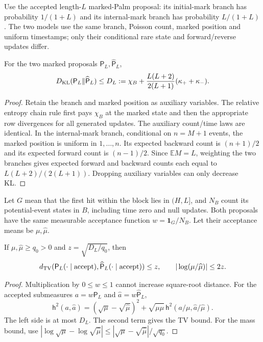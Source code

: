 Use the accepted length-$L$ marked-Palm proposal: its initial-mark branch
has probability $1/(1+L)$ and its internal-mark branch has probability
$L/(1+L)$. The two models use the same branch, Poisson count, marked
position and uniform timestamps; only their conditional rare state and
forward/reverse updates differ.

\begin{lemma}\label{lem:palmKL}
For the two marked proposals $\mathsf P_L,\widehat{\mathsf P}_L$,
\begin{equation}
D_{\rm KL}(\mathsf P_L\Vert\widehat{\mathsf P}_L)
\le D_L:=
\chi_B+\frac{L(L+2)}{2(L+1)}(\kappa_++\kappa_-).
\label{eq:DL}
\end{equation}
\end{lemma}
\begin{proof}
Retain the branch and marked position as auxiliary variables. The relative
entropy chain rule first pays $\chi_B$ at the marked state and then the
appropriate row divergences for all generated updates. The auxiliary
count/time laws are identical. In the internal-mark branch, conditional
on $n=M+1$ events, the marked position is uniform in $1,\ldots,n$.
Its expected backward count is $(n+1)/2$ and its expected forward count
is $(n-1)/2$. Since $\mathbb E M=L$, weighting the two branches gives
expected forward and backward counts each equal to
$L(L+2)/(2(L+1))$. Dropping auxiliary variables can only decrease KL.
\end{proof}

Let $G$ mean that the first hit within the block lies in $(H,L]$, and
$N_B$ count its potential-event states in $B$, including time zero and
null updates. Both proposals have the same measurable acceptance
function $w=\mathbf 1_G/N_B$. Let their acceptance means be
$\mu,\widehat\mu$.

\begin{lemma}\label{lem:acceptKL}
If $\mu,\widehat\mu\ge q_0>0$ and $z=\sqrt{D_L/q_0}$, then
\begin{equation}
d_{\rm TV}(\mathsf P_L(\cdot\mid\mathrm{accept}),
     \widehat{\mathsf P}_L(\cdot\mid\mathrm{accept}))\le z,
\qquad
|\log(\mu/\widehat\mu)|\le2z.
\label{eq:acceptKL}
\end{equation}
\end{lemma}
\begin{proof}
Multiplication by $0\le w\le1$ cannot increase square-root distance.
For the accepted submeasures $a=w\mathsf P_L$ and
$\widehat a=w\widehat{\mathsf P}_L$,
\begin{equation}
\mathsf h^2(a,\widehat a)=
(\sqrt\mu-\sqrt{\widehat\mu})^2+
\sqrt{\mu\widehat\mu}\,
\mathsf h^2(a/\mu,\widehat a/\widehat\mu).
\label{eq:submass}
\end{equation}
The left side is at most $D_L$. The second term gives the TV bound.
For the mass bound, use
$|\log\sqrt\mu-\log\sqrt{\widehat\mu}|
\le|\sqrt\mu-\sqrt{\widehat\mu}|/\sqrt{q_0}$.
\end{proof}

